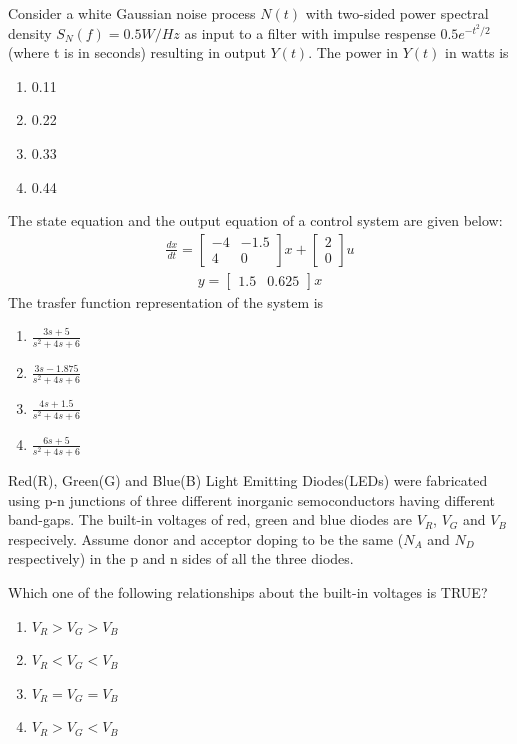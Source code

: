 \item Consider a white Gaussian noise process $N(t)$ with two-sided power spectral density $S_N(f) = 0.5W/Hz$ as input to a filter with impulse respense $0.5e^{-t^2/2}$(where t is in seconds) resulting in output $Y(t)$. The power in $Y(t)$ in watts is
\begin{enumerate}
\item 0.11
\item 0.22
\item 0.33
\item 0.44
\end{enumerate}

\item The state equation and the output equation of a control system are given below:
\begin{align*}
\frac{dx}{dt} = 
\begin{bmatrix}
-4 & -1.5 \\ 4 & 0
\end{bmatrix}x + 
\begin{bmatrix}
2 \\ 0
\end{bmatrix}u
\end{align*}
\begin{align*}
y = \begin{bmatrix}
1.5 & 0.625
\end{bmatrix}x
\end{align*}
The trasfer function representation of the system is
\begin{enumerate}
\item $\frac{3s + 5}{s^2 + 4s + 6}$
\item $\frac{3s - 1.875}{s^2 + 4s + 6}$
\item $\frac{4s + 1.5}{s^2 + 4s + 6}$
\item $\frac{6s + 5}{s^2 + 4s + 6}$
\end{enumerate}

\item Red(R), Green(G) and Blue(B) Light Emitting Diodes(LEDs) were fabricated using p-n junctions of three different inorganic semoconductors having different band-gaps. The built-in voltages of red, green and blue diodes are $V_R$, $V_G$ and $V_B$ respecively. Assume donor and acceptor doping to be the same ($N_A$ and $N_D$ respectively) in the p and n sides of all the three diodes.

Which one of the following relationships about the built-in voltages is TRUE?
\begin{enumerate}
\item $V_R > V_G > V_B$
\item $V_R < V_G < V_B$
\item $V_R = V_G = V_B$
\item $V_R > V_G < V_B$ 
\end{enumerate} 

